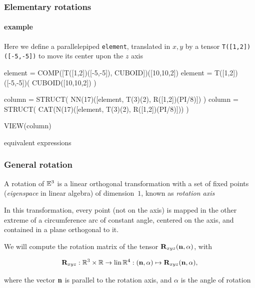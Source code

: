 \documentclass{beamer}
\begin{document}
\begin{frame}[fragile]
\frametitle{Elementary rotations}
\framesubtitle{example}\small


Here we define a parallelepiped  \texttt{element},  translated  in $x,y$ by a tensor \texttt{T([1,2])([-5,-5])} to move its center upon the $z$ axis

\vfill


\vfill

\begin{python}
element = COMP([T([1,2])([-5,-5]), CUBOID])([10,10,2])
element = T([1,2])([-5,-5])( CUBOID([10,10,2]) )

column = STRUCT( NN(17)([element, T(3)(2), R([1,2])(PI/8)]) )
column = STRUCT( CAT(N(17)([element, T(3)(2), R([1,2])(PI/8)])) )

VIEW(column)
\end{python}
equivalent expressions

\vfill
\end{frame}
\begin{frame}\frametitle{General rotation}\small

\vfill

A rotation of $\mathbb{E}^3$ is a linear orthogonal transformation with a set of fixed points (\emph{eigenspace} in linear algebra) of dimension~$1$, known as \emph{rotation axis}

\vfill
In this transformation, every point (not on the axis) is mapped in the other extreme of a circumference arc of constant angle, centered on the axis, and contained in a plane orthogonal to it.
\vfill

We will compute the rotation matrix of the tensor
${\bf R}_{xyz}({\bf n}, \alpha)$, with

\[
{\bf R}_{xyz} : \mathbb{R}^{3}\times\mathbb{R} \rightarrow \mbox{\rm lin}\,\mathbb{R}^{4} :
({\bf n}, \alpha) \mapsto {\bf R}_{xyz}({\bf n}, \alpha),
\]

where the vector ${\bf n}$ is parallel to the rotation axis, and $\alpha$ is the angle of rotation
\vfill
\end{frame}
\end{document}
